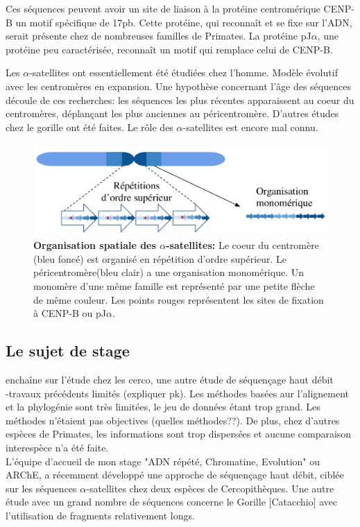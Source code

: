 \documentclass[12pt,a4paper]{article}
\begin{document}
Ces séquences peuvent avoir un site de liaison à la protéine centromérique CENP-B un motif spécifique de 17pb. Cette protéine, qui reconnaît et se fixe sur l'ADN, serait présente chez de nombreuses familles de Primates. La protéine pJ$\alpha$, une protéine peu caractérisée, reconnaît un motif qui remplace celui de CENP-B.

Les $\alpha$-satellites ont essentiellement été étudiées chez l'homme. Modèle évolutif avec les centromères en expansion. Une hypothèse concernant l'âge des séquences découle de ces recherches: les séquences les plus récentes apparaissent au coeur du centromères, déplançant les plus anciennes au péricentromère. D'autres études chez le gorille ont été faites. Le rôle des $\alpha$-satellites est encore mal connu. 

\begin{figure}
	\center
		\includegraphics[height=3.5cm, width=12cm]{img/AS_organization.png}
		\caption{\textbf{Organisation spatiale des $\alpha$-satellites:} Le coeur du centromère (bleu foncé) est organisé en répétition d'ordre supérieur. Le péricentromère(bleu clair) a une organisation monomérique. Un monomère d'une même famille est représenté par une petite flèche de même couleur. Les points rouges représentent les sites de fixation à CENP-B ou pJ$\alpha$.}
\end{figure}


\subsection{Le sujet de stage}
enchaîne sur l'étude chez les cerco, une autre étude de séquençage haut débit\\

-travaux précédents limités (expliquer pk). Les méthodes basées aur l'alignement et la phylogénie sont très limitées, le jeu de données étant trop grand. Les méthodes n'étaient pas objectives (quelles méthodes??). De plus, chez d'autres espèces de Primates, les informations sont trop dispersées et aucune comparaison interespèce n'a été faite. \\


L'équipe d'accueil de mon stage "ADN répété, Chromatine, Evolution" ou ARChE, a récemment développé une approche de séquençage haut débit, ciblée sur les séquences $\alpha$-satellites chez deux espèces de Cercopithèques. Une autre étude avec un grand nombre de séquences concerne le Gorille [Catacchio] avec l'utilisation de fragments relativement longs. 
\end{document}
